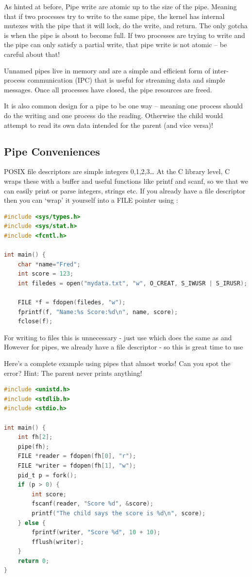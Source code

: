 As hinted at before, Pipe write are atomic up to the size of the pipe. Meaning that if two processes try to write to the same pipe, the kernel has internal mutexes with the pipe that it will lock, do the write, and return. The only gotcha is when the pipe is about to become full. If two processes are trying to write and the pipe can only satisfy a partial write, that pipe write is not atomic -- be careful about that!

Unnamed pipes live in memory and are a simple and efficient form of inter-process communication (IPC) that is useful for streaming data and simple messages. Once all processes have closed, the pipe resources are freed.

It is also common design for a pipe to be one way -- meaning one process should do the writing and one process do the reading. Otherwise the child would attempt to read its own data intended for the parent (and vice versa)!

\subsection{Pipe Conveniences}

POSIX file descriptors are simple integers 0,1,2,3\ldots{} At the C library level, C wraps these with a buffer and useful functions like printf and scanf, so we that we can easily print or parse integers, strings etc. If you already have a file descriptor then you can `wrap' it yourself into a FILE pointer using  :

\begin{lstlisting}[language=C]
#include <sys/types.h>
#include <sys/stat.h>
#include <fcntl.h>

int main() {
    char *name="Fred";
    int score = 123;
    int filedes = open("mydata.txt", "w", O_CREAT, S_IWUSR | S_IRUSR);

    FILE *f = fdopen(filedes, "w");
    fprintf(f, "Name:%s Score:%d\n", name, score);
    fclose(f);
\end{lstlisting}

For writing to files this is unnecessary - just use  which does the same as  and  However for pipes, we already have a file descriptor - so this is great time to use  

Here's a complete example using pipes that almost works! Can you spot the error? Hint: The parent never prints anything!

\begin{lstlisting}[language=C]
#include <unistd.h>
#include <stdlib.h>
#include <stdio.h>

int main() {
    int fh[2];
    pipe(fh);
    FILE *reader = fdopen(fh[0], "r");
    FILE *writer = fdopen(fh[1], "w");
    pid_t p = fork();
    if (p > 0) {
        int score;
        fscanf(reader, "Score %d", &score);
        printf("The child says the score is %d\n", score);
    } else {
        fprintf(writer, "Score %d", 10 + 10);
        fflush(writer);
    }
    return 0;
}
\end{lstlisting}

